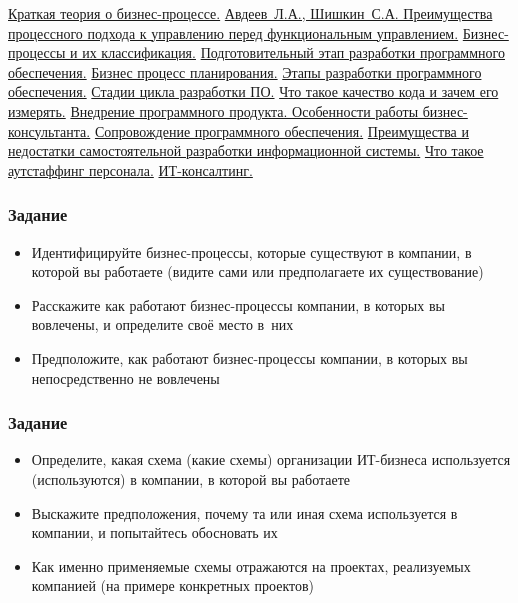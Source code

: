\documentclass{../industrial-development}
\begin{document}
\begin{thebibliography}{99}
 \href{http://www.businessstudio.com.ua/bp/bpshort.php}{Краткая теория о бизнес-процессе.}
 \href{http://jurnal.org/articles/2015/ekon123.html}{Авдеев~Л.А., Шишкин~С.А. Преимущества процессного подхода к управлению перед функциональным управлением.}
 \href{http://vseproip.com/biznes-ip/maluy/klassifikaciya-biznes-processov.html}{Бизнес-процессы и их классификация.}
 \href{https://habr.com/post/256915/}{Подготовительный этап разработки программного обеспечения.}
 \href{http://center-yf.ru/data/Marketologu/Biznes-process-planirovaniya.php}{Бизнес процесс планирования.}
 \href{http://ab-solut.net/ru/articles/etapi_po/}{Этапы разработки программного обеспечения.}
 \href{https://qalight.com.ua/baza-znaniy/stadii-tsikla-razrabotki-po/}{Стадии цикла разработки ПО.}
 \href{https://habr.com/post/205342/}{Что такое качество кода и зачем его измерять.}
 \href{https://habr.com/company/trinion/blog/242747/}{Внедрение программного продукта. Особенности работы бизнес-консультанта.}
 \href{https://ru.wikipedia.org/wiki/Сопровождение_программного_обеспечения}{Сопровождение программного обеспечения.}
 \href{https://lektsii.com/2-40143.html}{Преимущества и недостатки самостоятельной разработки информационной системы.}
 \href{https://delatdelo.com/spravochnik/terminy/chto-takoe-autstaffing-personala.html}{Что такое аутстаффинг персонала.}
 \href{https://ru.wikipedia.org/wiki/ИТ-консалтинг}{ИТ-консалтинг.}
\end{thebibliography}

\begin{frame}\frametitle{Задание}
  \begin{itemize}
  \item Идентифицируйте бизнес-процессы, которые существуют в компании, в которой вы работаете (видите сами или предполагаете их существование)
  \item Расскажите как работают бизнес-процессы компании, в которых вы вовлечены, и определите своё место в~них
  \item Предположите, как работают бизнес-процессы компании, в которых вы непосредственно не вовлечены
  \end{itemize}
\end{frame}

\begin{frame}\frametitle{Задание}
  \begin{itemize}
  \item Определите, какая схема (какие схемы) организации ИТ-бизнеса используется (используются) в компании, в которой вы работаете
  \item Выскажите предположения, почему та или иная схема используется в компании, и попытайтесь обосновать их
  \item Как именно применяемые схемы отражаются на проектах, реализуемых компанией (на примере конкретных проектов)
  \end{itemize}
\end{frame}
\end{document}

